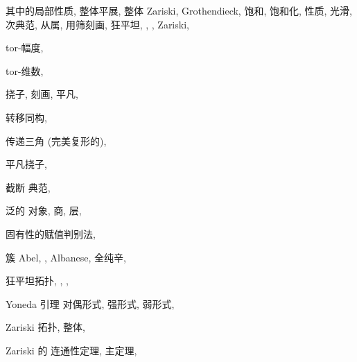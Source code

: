 \begin{theindex}
\subsubitem 其中的局部性质, 
\subitem 整体平展, 
\subitem 整体 Zariski, 
\subitem Grothendieck, 
\subitem 饱和, 
\subitem 饱和化, 
\subsubitem 性质, 
\subitem 光滑, 
\subitem 次典范, 
\subitem 从属, 
\subsubitem 用筛刻画, 
\subitem 狂平坦, , , 
\subitem Zariski, 
\item tor-幅度, 
\item tor-维数, 
\item 挠子, 
\subitem 刻画, 
\subitem 平凡, 
\item 转移同构, 
\item 传递三角 (完美复形的), 
\item 平凡挠子, 
\item 截断
\subitem 典范, 
\indexspace
\item 泛的
\subitem 对象, 
\subitem 商, 
\subitem 层, 
\indexspace
\item 固有性的赋值判别法, 
\item 簇
\subitem Abel, , 
\subitem Albanese, 
\subitem 全纯辛, 
\indexspace
\item 狂平坦拓扑, , , 
\indexspace
\item Yoneda 引理
\subitem 对偶形式, 
\subitem 强形式, 
\subitem 弱形式, 
\indexspace
\item Zariski 拓扑, 
\subitem 整体, 
\item Zariski 的
\subitem 连通性定理, 
\subitem 主定理, 

\endgroup
\end{theindex}
